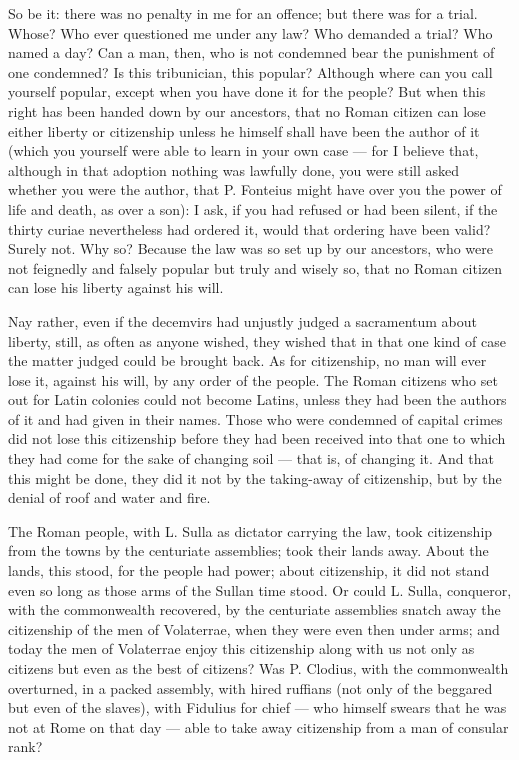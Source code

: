  So be it: there was no penalty in me for an offence; but there was for a trial. Whose? Who ever questioned me under any law? Who demanded a trial? Who named a day? Can a man, then, who is not condemned bear the punishment of one condemned? Is this tribunician, this popular? Although where can you call yourself popular, except when you have done it for the people? But when this right has been handed down by our ancestors, that no Roman citizen can lose either liberty or citizenship unless he himself shall have been the author of it (which you yourself were able to learn in your own case --- for I believe that, although in that adoption nothing was lawfully done, you were still asked whether you were the author, that P. Fonteius might have over you the power of life and death, as over a son): I ask, if you had refused or had been silent, if the thirty curiae nevertheless had ordered it, would that ordering have been valid? Surely not. Why so? Because the law was so set up by our ancestors, who were not feignedly and falsely popular but truly and wisely so, that no Roman citizen can lose his liberty against his will.

 Nay rather, even if the decemvirs had unjustly judged a sacramentum about liberty, still, as often as anyone wished, they wished that in that one kind of case the matter judged could be brought back. As for citizenship, no man will ever lose it, against his will, by any order of the people. The Roman citizens who set out for Latin colonies could not become Latins, unless they had been the authors of it and had given in their names. Those who were condemned of capital crimes did not lose this citizenship before they had been received into that one to which they had come for the sake of changing soil --- that is, of changing it. And that this might be done, they did it not by the taking-away of citizenship, but by the denial of roof and water and fire.

 The Roman people, with L. Sulla as dictator carrying the law, took citizenship from the towns by the centuriate assemblies; took their lands away. About the lands, this stood, for the people had power; about citizenship, it did not stand even so long as those arms of the Sullan time stood. Or could L. Sulla, conqueror, with the commonwealth recovered, by the centuriate assemblies snatch away the citizenship of the men of Volaterrae, when they were even then under arms; and today the men of Volaterrae enjoy this citizenship along with us not only as citizens but even as the best of citizens? Was P. Clodius, with the commonwealth overturned, in a packed assembly, with hired ruffians (not only of the beggared but even of the slaves), with Fidulius for chief --- who himself swears that he was not at Rome on that day --- able to take away citizenship from a man of consular rank?

